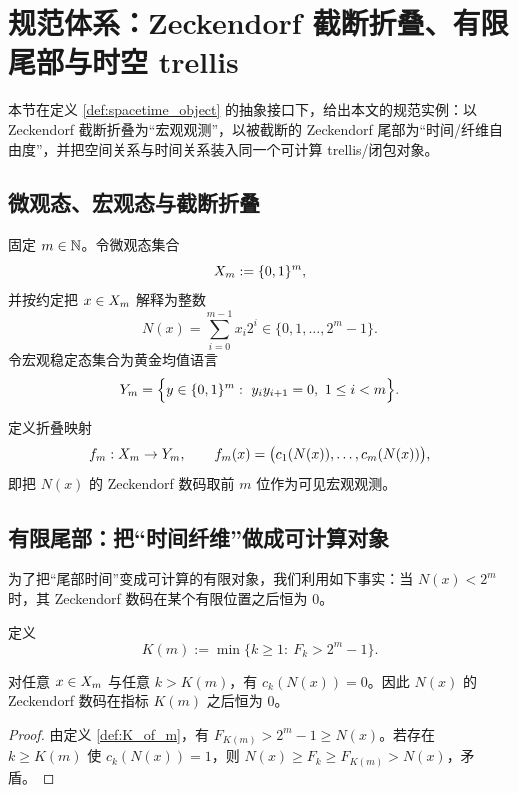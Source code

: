 \section{规范体系：Zeckendorf 截断折叠、有限尾部与时空 trellis}

本节在定义 \ref{def:spacetime_object} 的抽象接口下，给出本文的规范实例：以 Zeckendorf 截断折叠为“宏观观测”，以被截断的 Zeckendorf 尾部为“时间/纤维自由度”，并把空间关系与时间关系装入同一个可计算 trellis/闭包对象。

\subsection{微观态、宏观态与截断折叠}

固定 $m\in\mathbb{N}$。令微观态集合
$$
X_m:=\{0,1\}^m,
$$
并按约定把 $x\in X_m$ 解释为整数
$$
N(x)=\sum_{i=0}^{m-1} x_i 2^i\in\{0,1,\dots,2^m-1\}.
$$
令宏观稳定态集合为黄金均值语言
$$
Y_m=\Bigl\{y\in\{0,1\}^m:\ y_i y_{i+1}=0,\ 1\le i<m\Bigr\}.
$$

\begin{definition}\label{def:fold_zeckendorf}
定义折叠映射
$$
f_m:X_m\to Y_m,\qquad
f_m(x)=\bigl(c_1(N(x)),\dots,c_m(N(x))\bigr),
$$
即把 $N(x)$ 的 Zeckendorf 数码取前 $m$ 位作为可见宏观观测。
\end{definition}

\subsection{有限尾部：把“时间纤维”做成可计算对象}

为了把“尾部时间”变成可计算的有限对象，我们利用如下事实：当 $N(x)<2^m$ 时，其 Zeckendorf 数码在某个有限位置之后恒为 $0$。

\begin{definition}[覆盖指数]\label{def:K_of_m}
定义
$$
K(m):=\min\{k\ge 1:\ F_k>2^m-1\}.
$$
\end{definition}

\begin{lemma}[有限支撑]\label{lem:finite_tail_support}
对任意 $x\in X_m$ 与任意 $k>K(m)$，有 $c_k(N(x))=0$。因此 $N(x)$ 的 Zeckendorf 数码在指标 $K(m)$ 之后恒为 $0$。
\end{lemma}

\begin{proof}
由定义 \ref{def:K_of_m}，有 $F_{K(m)}>2^m-1\ge N(x)$。若存在 $k\ge K(m)$ 使 $c_k(N(x))=1$，则 $N(x)\ge F_k\ge F_{K(m)}>N(x)$，矛盾。
\end{proof}


